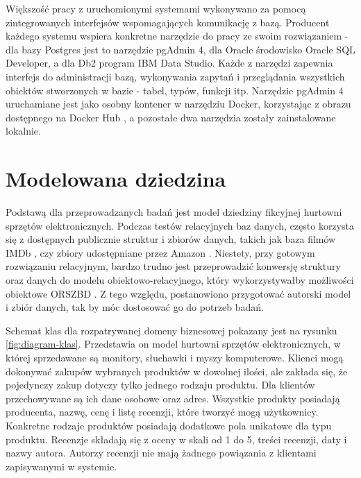 \documentclass[a4paper,twoside,12pt]{book}
\begin{document}
Większość pracy z uruchomionymi systemami wykonywano za pomocą zintegrowanych interfejsów wspomagających komunikację z bazą. Producent każdego systemu wspiera konkretne narzędzie do pracy ze swoim rozwiązaniem - dla bazy Postgres jest to narzędzie pgAdmin 4, dla Oracle środowisko Oracle SQL Developer, a dla Db2 program IBM Data Studio. Każde z narzędzi zapewnia interfejs do administracji bazą, wykonywania zapytań i przeglądania wszystkich obiektów stworzonych w bazie - tabel, typów, funkcji itp. Narzędzie pgAdmin 4 uruchamiane jest jako osobny kontener w narzędziu Docker, korzystając z obrazu dostępnego na Docker Hub \cite{bib:docker-pgadmin}, a pozostałe dwa narzędzia zostały zainstalowane lokalnie.

\section{Modelowana dziedzina}

Podstawą dla przeprowadzanych badań jest model dziedziny fikcyjnej hurtowni sprzętów elektronicznych. Podczas testów relacyjnych baz danych, często korzysta się z dostępnych publicznie struktur i zbiorów danych, takich jak baza filmów IMDb \cite{bib:dataset-imdb}, czy zbiory udostępniane przez Amazon \cite{bib:dataset-amazon}. Niestety, przy gotowym rozwiązaniu relacyjnym, bardzo trudno jest przeprowadzić konwersję struktury oraz danych do modelu obiektowo-relacyjnego, który wykorzystywałby możliwości obiektowe ORSZBD \cite{bib:fundamentals-for-automation-of-ordb-design}. Z tego względu, postanowiono przygotować autorski model i zbiór danych, tak by móc dostosować go do potrzeb badań.

Schemat klas dla rozpatrywanej domeny biznesowej pokazany jest na rysunku \ref{fig:diagram-klas}. Przedstawia on model hurtowni sprzętów elektronicznych, w której sprzedawane są monitory, słuchawki i myszy komputerowe. Klienci mogą dokonywać zakupów wybranych produktów w dowolnej ilości, ale zakłada się, że pojedynczy zakup dotyczy tylko jednego rodzaju produktu. Dla klientów przechowywane są ich dane osobowe oraz adres. Wszystkie produkty posiadają producenta, nazwę, cenę i listę recenzji, które tworzyć mogą użytkownicy. Konkretne rodzaje produktów posiadają dodatkowe pola unikatowe dla typu produktu. Recenzje składają się z oceny w skali od 1 do 5, treści recenzji, daty i nazwy autora. Autorzy recenzji nie mają żadnego powiązania z klientami zapisywanymi w systemie.
\end{document}
